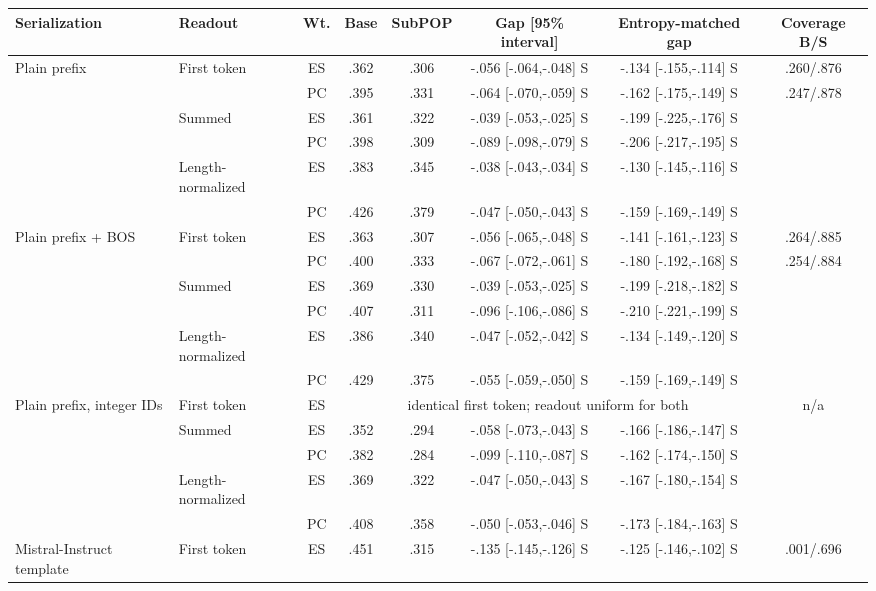 \begin{table}[t]
\centering\scriptsize
\setlength{\tabcolsep}{4pt}
\begin{tabular}{@{}llcccccc@{}}
\toprule
Serialization & Readout & Wt. & Base & SubPOP & Gap [95\% interval] & Entropy-matched gap & Coverage B/S \\
\midrule
Plain prefix & First token & ES & .362 & .306 & -.056 [-.064,-.048] S & -.134 [-.155,-.114] S & .260/.876 \\
 &  & PC & .395 & .331 & -.064 [-.070,-.059] S & -.162 [-.175,-.149] S & .247/.878 \\
 & Summed & ES & .361 & .322 & -.039 [-.053,-.025] S & -.199 [-.225,-.176] S &  \\
 &  & PC & .398 & .309 & -.089 [-.098,-.079] S & -.206 [-.217,-.195] S &  \\
 & Length-normalized & ES & .383 & .345 & -.038 [-.043,-.034] S & -.130 [-.145,-.116] S &  \\
 &  & PC & .426 & .379 & -.047 [-.050,-.043] S & -.159 [-.169,-.149] S &  \\
Plain prefix + BOS & First token & ES & .363 & .307 & -.056 [-.065,-.048] S & -.141 [-.161,-.123] S & .264/.885 \\
 &  & PC & .400 & .333 & -.067 [-.072,-.061] S & -.180 [-.192,-.168] S & .254/.884 \\
 & Summed & ES & .369 & .330 & -.039 [-.053,-.025] S & -.199 [-.218,-.182] S &  \\
 &  & PC & .407 & .311 & -.096 [-.106,-.086] S & -.210 [-.221,-.199] S &  \\
 & Length-normalized & ES & .386 & .340 & -.047 [-.052,-.042] S & -.134 [-.149,-.120] S &  \\
 &  & PC & .429 & .375 & -.055 [-.059,-.050] S & -.159 [-.169,-.149] S &  \\
Plain prefix, integer IDs & First token & ES & \multicolumn{4}{c}{identical first token; readout uniform for both} & n/a \\
 & Summed & ES & .352 & .294 & -.058 [-.073,-.043] S & -.166 [-.186,-.147] S &  \\
 &  & PC & .382 & .284 & -.099 [-.110,-.087] S & -.162 [-.174,-.150] S &  \\
 & Length-normalized & ES & .369 & .322 & -.047 [-.050,-.043] S & -.167 [-.180,-.154] S &  \\
 &  & PC & .408 & .358 & -.050 [-.053,-.046] S & -.173 [-.184,-.163] S &  \\
Mistral-Instruct template & First token & ES & .451 & .315 & -.135 [-.145,-.126] S & -.125 [-.146,-.102] S & .001/.696 \\

\end{tabular}
\end{table}
